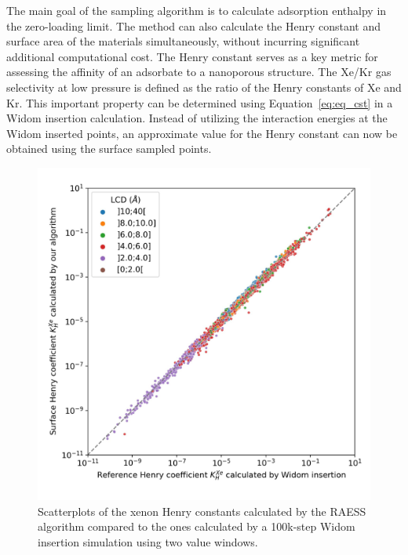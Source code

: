 \documentclass[main]{subfiles}
\begin{document}
The main goal of the sampling algorithm is to calculate adsorption enthalpy in the zero-loading limit. The method can also calculate the Henry constant and surface area of the materials simultaneously, without incurring significant additional computational cost. The Henry constant serves as a key metric for assessing the affinity of an adsorbate to a nanoporous structure. The Xe/Kr gas selectivity at low pressure is defined as the ratio of the Henry constants of Xe and Kr. This important property can be determined using Equation~\ref{eq:eq_cst} in a Widom insertion calculation. Instead of utilizing the interaction energies at the Widom inserted points, an approximate value for the Henry constant can now be obtained using the surface sampled points.

\begin{figure}[ht]
  \centering
  \includegraphics[width=0.6\linewidth]{figures/3-fastsim/K_Xe_widom_vs_K_Xe_surface_final_zoom.jpg}
    \caption{Scatterplots of the xenon Henry constants calculated by the RAESS algorithm compared to the ones calculated by a 100k-step Widom insertion simulation using two value windows.}\label{fgr:henry_scatter}
\end{figure}
\end{document}
